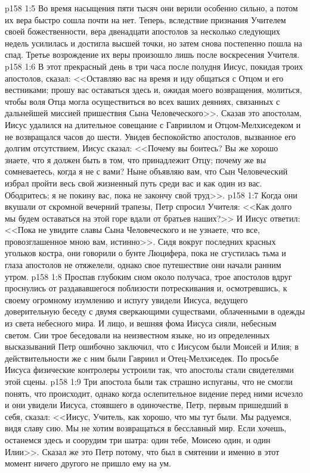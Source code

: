 \vs p158 1:5 Во время насыщения пяти тысяч они верили особенно сильно, а потом их вера быстро сошла почти на нет. Теперь, вследствие признания Учителем своей божественности, вера двенадцати апостолов за несколько следующих недель усилилась и достигла высшей точки, но затем снова постепенно пошла на спад. Третье возрождение их веры произошло лишь после воскресения Учителя.
\vs p158 1:6 В этот прекрасный день в три часа после полудня Иисус, покидая троих апостолов, сказал: <<Оставляю вас на время и иду общаться с Отцом и его вестниками; прошу вас оставаться здесь и, ожидая моего возвращения, молиться, чтобы воля Отца могла осуществиться во всех ваших деяниях, связанных с дальнейшей миссией пришествия Сына Человеческого>>. Сказав это апостолам, Иисус удалился на длительное совещание с Гавриилом и Отцом\hyp{}Мелхиседеком и не возвращался часов до шести. Увидев беспокойство апостолов, вызванное его долгим отсутствием, Иисус сказал: <<Почему вы боитесь? Вы же хорошо знаете, что я должен быть в том, что принадлежит Отцу; почему же вы сомневаетесь, когда я не с вами? Ныне объявляю вам, что Сын Человеческий избрал пройти весь свой жизненный путь среди вас и как один из вас. Ободритесь; я не покину вас, пока не закончу свой труд>>.
\vs p158 1:7 Когда они вкушали от скромной вечерний трапезы, Петр спросил Учителя: <<Как долго мы будем оставаться на этой горе вдали от братьев наших?>> И Иисус ответил: <<Пока не увидите славы Сына Человеческого и не узнаете, что все, провозглашенное мною вам, истинно>>. Сидя вокруг последних красных угольков костра, они говорили о бунте Люцифера, пока не сгустилась тьма и глаза апостолов не отяжелели, однако свое путешествие они начали ранним утром.
\vs p158 1:8 Проспав глубоким сном около получаса, трое апостолов вдруг проснулись от раздававшегося поблизости потрескивания и, осмотревшись, к своему огромному изумлению и испугу увидели Иисуса, ведущего доверительную беседу с двумя сверкающими существами, облаченными в одежды из света небесного мира. И лицо, и вешняя фома Иисуса сияли, небесным светом. Сии трое беседовали на неизвестном языке, но из определенных высказываний Петр ошибочно заключил, что с Иисусом были Моисей и Илия; в действительности же с ним были Гавриил и Отец\hyp{}Мелхиседек. По просьбе Иисуса физические контролеры устроили так, что апостолы стали свидетелями этой сцены.
\vs p158 1:9 Три апостола были так страшно испуганы, что не смогли понять, что происходит, однако когда ослепительное видение перед ними исчезло и они увидели Иисуса, стоявшего в одиночестве, Петр, первым пришедший в себя, сказал: <<Иисус, Учитель, как хорошо, что мы тут были. Мы радуемся, видя славу сию. Мы не хотим возвращаться в бесславный мир. Если хочешь, останемся здесь и соорудим три шатра: один тебе, Моисею один, и один Илии>>. Сказал же это Петр потому, что был в смятении и именно в этот момент ничего другого не пришло ему на ум.
